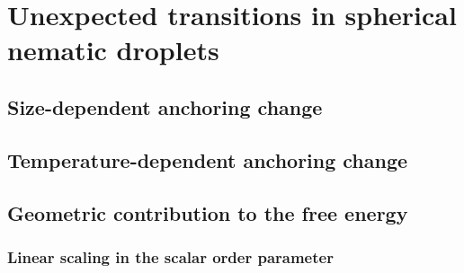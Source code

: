 \chapter{Unexpected transitions in spherical nematic droplets}

\section{Size-dependent anchoring change}

\section{Temperature-dependent anchoring change}

\section{Geometric contribution to the free energy}
\subsection{Linear scaling in the scalar order parameter}
